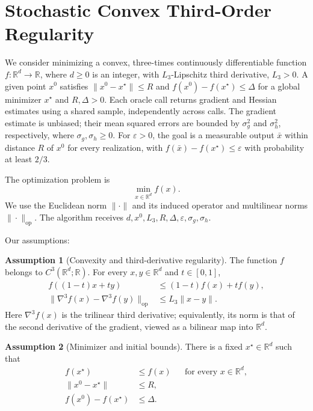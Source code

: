 \documentclass[10pt]{article}
\theoremstyle{definition}
\newtheorem{assumption}{Assumption}
\begin{document}
\section*{Stochastic Convex Third-Order Regularity}
We consider minimizing a convex, three-times continuously differentiable function $f:\mathbb{R}^d\to\mathbb{R}$, where $d\geq0$ is an integer, with $L_3$-Lipschitz third derivative, $L_3>0$. A given point $x^0$ satisfies $\|x^0-x^\star\|\leq R$ and $f(x^0)-f(x^\star)\leq\Delta$ for a global minimizer $x^\star$ and $R,\Delta>0$. Each oracle call returns gradient and Hessian estimates using a shared sample, independently across calls. The gradient estimate is unbiased; their mean squared errors are bounded by $\sigma_g^2$ and $\sigma_h^2$, respectively, where $\sigma_g,\sigma_h\geq0$. For $\varepsilon>0$, the goal is a measurable output $\bar{x}$ within distance $R$ of $x^0$ for every realization, with $f(\bar{x})-f(x^\star)\leq\varepsilon$ with probability at least $2/3$.

The optimization problem is
\[
\min_{x\in\mathbb{R}^d} f(x).
\]
We use the Euclidean norm $\|\cdot\|$ and its induced operator and multilinear norms $\|\cdot\|_{\mathrm{op}}$. The algorithm receives $d,x^0,L_3,R,\Delta,\varepsilon,\sigma_g,\sigma_h$.

Our assumptions:
\begin{assumption}[Convexity and third-derivative regularity]
The function $f$ belongs to $C^3(\mathbb{R}^d;\mathbb{R})$. For every $x,y\in\mathbb{R}^d$ and $t\in[0,1]$,
\[
\begin{aligned}
f((1-t)x+ty)&\leq(1-t)f(x)+t f(y),\\
\|\nabla^3 f(x)-\nabla^3 f(y)\|_{\mathrm{op}}
&\leq L_3\|x-y\|.
\end{aligned}
\]
Here $\nabla^3 f(x)$ is the trilinear third derivative; equivalently, its norm is that of the second derivative of the gradient, viewed as a bilinear map into $\mathbb{R}^d$.
\end{assumption}

\begin{assumption}[Minimizer and initial bounds]
There is a fixed $x^\star\in\mathbb{R}^d$ such that
\[
\begin{aligned}
f(x^\star)&\leq f(x) &&\text{for every }x\in\mathbb{R}^d,\\
\|x^0-x^\star\|&\leq R,\\
f(x^0)-f(x^\star)&\leq\Delta.
\end{aligned}
\]
\end{assumption}
\end{document}
